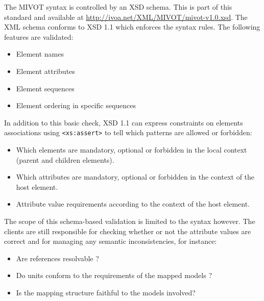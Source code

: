 The MIVOT syntax is controlled by an XSD schema.
This is part of this standard and available at \url{http://ivoa.net/XML/MIVOT/mivot-v1.0.xsd}.
The XML schema conforms to XSD 1.1 \citep{std:xsd1.1} which enforces the syntax rules. 
The following features are validated:

\begin{itemize} 
  \item Element names 
  \item Element attributes
  \item Element sequences 
  \item Element ordering in specific sequences
\end{itemize}

In addition to this basic check, XSD 1.1 can express constraints on elements associations using \texttt{<xs:assert>} to tell which patterns are allowed or forbidden:

\begin{itemize} 
  \item Which elements are mandatory, optional  or forbidden in the local context (parent and children elements).
  \item Which attributes are mandatory, optional  or forbidden in the context of the host element.
  \item Attribute value requirements according to the context of the host element.

\end{itemize}
 
The scope of this schema-based validation is limited to the syntax however. 
The clients are still responsible for checking whether or not the attribute values are correct and for managing any semantic inconsistencies, for instance:

\begin{itemize} 
  \item Are references resolvable ? %
  \item Do units conform to the requirements of the mapped models ?
  \item Is the mapping structure faithful to the %
  models involved?
\end{itemize}



